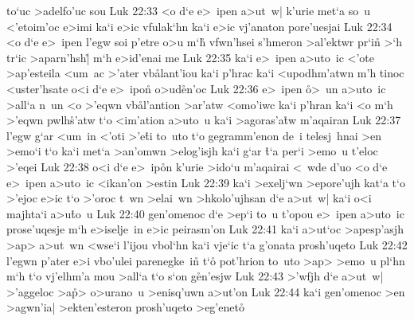 to`uc
>adelfo'uc
sou\bibvsend
\vs Luk 22:33
<o
d`e
e>~ipen
a>ut~w|
k'urie
met`a
so~u
<'etoim'oc
e>imi
ka`i
e>ic
vfulak`hn
ka`i
e>ic
vj'anaton
pore'uesjai\bibvsend
\vs Luk 22:34
<o
d`e
e>~ipen
l'egw
soi
p'etre
o>u
m`h\r{}
vfwn'hsei
s'hmeron
>al'ektwr
pr`in\r{}
>`h
tr`ic
>aparn'hsh|\r{}
m`h
e>id'enai
me\bibvsend
\vs Luk 22:35
ka`i
e>~ipen
a>uto~ic
<'ote
>ap'esteila
<um~ac
>'ater
vb\r{a}lant'iou
ka`i
p'hrac
ka`i
<upodhm'atwn
m'h
tinoc
<uster'hsate
o<i
d`e
e>~ipon\r{}
o>ud\r{e}n'oc\bibvsend
{}
\vs Luk 22:36
e>~ipen
\r{o}>~un
a>uto~ic
>all`a
n~un
<o
>'eqwn
vb\r{a}l'antion
>ar'atw
<omo'iwc
ka`i
p'hran
ka`i
<o
m`h
>'eqwn
pwlh\r{s}'atw
t`o
<im'ation
a>uto~u
ka`i
>agoras'a\r{t}w
m'aqairan\bibvsend
\vs Luk 22:37
l'egw
g`ar
<um~in
<'oti
>'e\r{t}i
to~uto
t`o
gegramm'enon
de~i
telesj~hnai
>en
>emo`i
t`o
ka`i
met`a
>an'omwn
>elog'isjh
ka`i
g`ar
\r{t}`a
per`i
>emo~u
t'eloc
>'eqei\bibvsend
\vs Luk 22:38
o<i
d`e
e>~ip\r{o}n
k'urie
>ido`u
m'aqairai
<~wde
d'uo
<o
d`e
e>~ipen
a>uto~ic
<ikan'on
>estin\bibvsend
\vs Luk 22:39
ka`i
>exelj`wn
>epore'ujh
kat`a
t`o
>'ejoc
e>ic
t`o
>'oroc
t~wn
>elai~wn
>hkolo'ujhsan
d`e
a>ut~w|
ka`i
o<i
majhta`i
a>u\r{t}o~u\bibvsend
{}
\vs Luk 22:40
gen'omenoc
d`e
>ep`i
to~u
t'opou
e>~ipen
a>uto~ic
prose'uqesje
m`h
e>iselje~in
e>ic
peirasm'on\bibvsend
\vs Luk 22:41
ka`i
a>ut`oc
>apesp'asjh
>ap>
a>ut~wn
<wse`i
l'ijou
vbol`hn
ka`i
vje`ic
t`a
g'onata
prosh'uqeto\bibvsend
\vs Luk 22:42
l'egwn
p'ater
e>i
vbo'ulei
parenegke~in\r{}
t`o\r{}
pot'hrion
to~uto
>ap>
>emo~u
pl`hn
m`h
t`o
vj'elhm'a
mou
>all`a
t`o
s`on
g\r{e}n'esjw\bibvsend
{}
\vs Luk 22:43
>'wfjh
d`e
a>ut~w|
>'aggeloc
>a\r{p}>
o>urano~u
>enisq'uwn
a>ut'on\bibvsend
\vs Luk 22:44
ka`i
gen'omenoc
>en
>agwn'ia|
>ekten'esteron
prosh'uqeto
>eg'eneto\r{}
